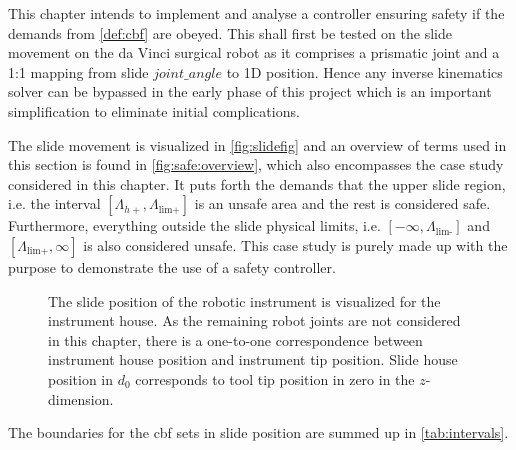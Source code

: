 This chapter intends to implement and analyse a controller ensuring safety if the demands from \autoref{def:cbf} %
are obeyed. This shall first be tested on the slide movement on the da Vinci surgical robot as it comprises a prismatic joint and a 1:1 mapping from slide $joint\_angle$ to 1D position. Hence any inverse kinematics solver can be bypassed in the early phase of this project which is an important simplification to eliminate initial complications.

The slide movement is visualized in \autoref{fig:slidefig} and an overview of terms used in this section is found in \autoref{fig:safe:overview}, which also encompasses  the case study considered in this chapter. It puts forth the demands that the upper slide region, i.e. the interval $[\Lambda_{h+},\Lambda_\text{lim+}]$ is an unsafe area and the rest is considered safe. Furthermore, everything outside the slide physical limits, i.e. $[-\infty,\Lambda_\text{lim-}]$ and $[\Lambda_\text{lim+},\infty]$ is also considered unsafe. This case study is purely made up with the purpose to demonstrate the use of a safety controller.
\begin{figure}[H]
\centering
{}%
%
\caption{The slide position of the robotic instrument is visualized for the instrument house. As the remaining robot joints are not considered in this chapter, there is a one-to-one correspondence between instrument house position and instrument tip position. Slide house position in $d_0$ corresponds to tool tip position in zero in the $z$-dimension.}
\label{fig:slide}
\end{figure}

\vspace{-1mm}
The boundaries for the \gls{cbf} sets in slide position are summed up in \autoref{tab:intervals}.

